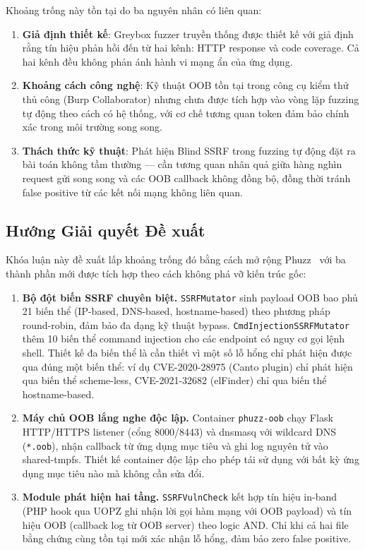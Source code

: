Khoảng trống này tồn tại do ba nguyên nhân có liên quan:

\begin{enumerate}
    \item \textbf{Giả định thiết kế}: Greybox fuzzer truyền thống được thiết kế với
    giả định rằng tín hiệu phản hồi đến từ hai kênh: HTTP response và code coverage.
    Cả hai kênh đều không phản ánh hành vi mạng ẩn của ứng dụng.
    \item \textbf{Khoảng cách công nghệ}: Kỹ thuật OOB tồn tại trong công cụ kiểm
    thử thủ công (Burp Collaborator) nhưng chưa được tích hợp vào vòng lặp fuzzing
    tự động theo cách có hệ thống, với cơ chế tương quan token đảm bảo chính xác
    trong môi trường song song.
    \item \textbf{Thách thức kỹ thuật}: Phát hiện Blind SSRF trong fuzzing tự động
    đặt ra bài toán không tầm thường --- cần tương quan nhân quả giữa hàng nghìn
    request gửi song song và các OOB callback không đồng bộ, đồng thời tránh false
    positive từ các kết nối mạng không liên quan.
\end{enumerate}

\subsection{Hướng Giải quyết Đề xuất}

Khóa luận này đề xuất lấp khoảng trống đó bằng cách mở rộng Phuzz~\cite{neef2024phuzz}
với ba thành phần mới được tích hợp theo cách không phá vỡ kiến trúc gốc:

\begin{enumerate}
    \item \textbf{Bộ đột biến SSRF chuyên biệt.} \texttt{SSRFMutator} sinh payload
    OOB bao phủ 21 biến thể (IP-based, DNS-based, hostname-based) theo phương pháp
    round-robin, đảm bảo đa dạng kỹ thuật bypass. \texttt{CmdInjectionSSRFMutator}
    thêm 10 biến thể command injection cho các endpoint có nguy cơ gọi lệnh shell.
    Thiết kế đa biến thể là cần thiết vì một số lỗ hổng chỉ phát hiện được qua đúng
    một biến thể: ví dụ CVE-2020-28975 (Canto plugin) chỉ phát hiện qua biến thể
    scheme-less, CVE-2021-32682 (elFinder) chỉ qua biến thể hostname-based.

    \item \textbf{Máy chủ OOB lắng nghe độc lập.} Container \texttt{phuzz-oob} chạy
    Flask HTTP/HTTPS listener (cổng 8000/8443) và dnsmasq với wildcard DNS
    (\texttt{*.oob}), nhận callback từ ứng dụng mục tiêu và ghi log nguyên tử vào
    shared-tmpfs. Thiết kế container độc lập cho phép tái sử dụng với bất kỳ ứng dụng
    mục tiêu nào mà không cần sửa đổi.

    \item \textbf{Module phát hiện hai tầng.} \texttt{SSRFVulnCheck} kết hợp tín hiệu
    in-band (PHP hook qua UOPZ ghi nhận lời gọi hàm mạng với OOB payload) và tín hiệu
    OOB (callback log từ OOB server) theo logic AND. Chỉ khi cả hai file bằng chứng
    cùng tồn tại mới xác nhận lỗ hổng, đảm bảo zero false positive.
\end{enumerate}

